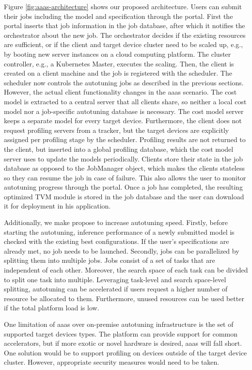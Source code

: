 Figure \ref{fig:aaas-architecture} shows our proposed architecture. Users can submit their jobs including the model and specification through the portal. First the portal inserts that job information in the job database, after which it notifies the orchestrator about the new job. The orchestrator decides if the existing resources are sufficient, or if the client and target device cluster need to be scaled up, e.g., by booting new server instances on a cloud computing platform. The cluster controller, e.g., a Kubernetes Master, executes the scaling. Then, the client is created on a client machine and the job is registered with the scheduler.
The scheduler now controls the autotuning jobs as described in the previous sections. However, the actual client functionality changes in the \gls{aaas} scenario. The cost model is extracted to a central server that all clients share, so neither a local cost model nor a job-specific autotuning database is necessary. The cost model server keeps a separate model for every target device. Furthermore, the client does not request profiling servers from a tracker, but the target devices are explicitly assigned per profiling stage by the scheduler. Profiling results are not returned to the client, but inserted into a global profiling database, which the cost model server uses to update the models periodically. Clients store their state in the job database as opposed to the JobManager object, which makes the clients stateless so they can resume the job in case of failure. This also allows the user to monitor autotuning progress through the portal. Once a job has completed, the resulting optimized TVM module is stored in the job database and the user can download it for deployment in his application.

Additionally, we make propose to increase autotuning speed. Firstly, before starting the autotuning, inference performance of a newly submitted model is checked with the existing best configurations. If the user's specifications are already met, no job needs to be launched. Secondly, jobs can be parallelized by splitting them into multiple jobs. Jobs consist of a set of tasks that are independent of each other. Moreover, the search space of each task can be divided to split one task into multiple. Leveraging task-level and search space-level splitting, autotuning can be accelerated if users request a higher number of resource be allocated to them. Furthermore, unused resources can be used better if the total platform load is low.

One limitation of \gls{aaas} over on-premise autotuning infrastructure is the set of supported target devices types. The platform can provide support for common accelerators, but if more exotic or novel hardware is desired, \gls{aaas} will fall short. One solution would be to support profiling on devices outside of the target device cluster. However, appropriate security measures would need to be taken.

